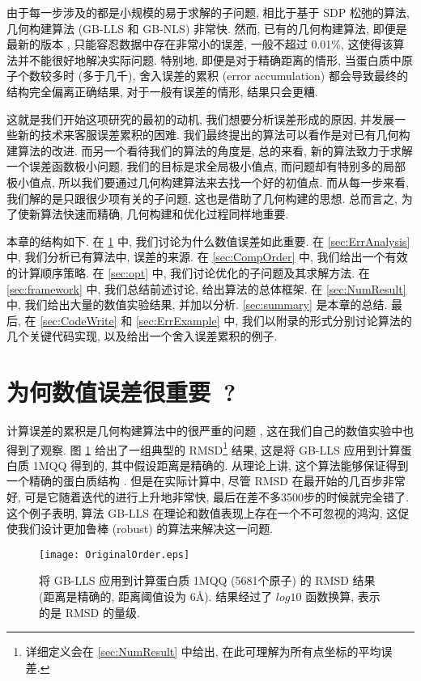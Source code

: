 \documentclass{CASthesis_zzk}
\begin{document}
由于每一步涉及的都是小规模的易于求解的子问题, 相比于基于 SDP 松弛的算法, 
几何构建算法 (GB-LLS 和 GB-NLS) 非常快. 
然而, 已有的几何构建算法, 即便是最新的版本 \cite{Sit2009},
只能容忍数据中存在非常小的误差, 一般不超过 0.01\%, 
这使得该算法并不能很好地解决实际问题.
特别地, 即便是对于精确距离的情形, 当蛋白质中原子个数较多时 (多于几千),
舍入误差的累积 (error accumulation) 都会导致最终的结构完全偏离正确结果,
对于一般有误差的情形, 结果只会更糟.

这就是我们开始这项研究的最初的动机, 我们想要分析误差形成的原因,
并发展一些新的技术来客服误差累积的困难.
我们最终提出的算法可以看作是对已有几何构建算法的改进.
而另一个看待我们的算法的角度是, 
总的来看, 新的算法致力于求解一个误差函数极小问题, 我们的目标是求全局极小值点,
而问题却有特别多的局部极小值点, 所以我们要通过几何构建算法来去找一个好的初值点.
而从每一步来看, 我们解的是只跟很少项有关的子问题,
这也是借助了几何构建的思想.
总而言之, 为了使新算法快速而精确, 几何构建和优化过程同样地重要.

本章的结构如下. 
在 \ref{sec:ErrImportant} 中, 我们讨论为什么数值误差如此重要.
在 \ref{sec:ErrAnalysis} 中, 我们分析已有算法中, 误差的来源.
在 \ref{sec:CompOrder} 中, 我们给出一个有效的计算顺序策略.
在 \ref{sec:opt} 中, 我们讨论优化的子问题及其求解方法.
在 \ref{sec:framework} 中, 我们总结前述讨论, 给出算法的总体框架.
在 \ref{sec:NumResult} 中, 我们给出大量的数值实验结果, 并加以分析.
\ref{sec:summary} 是本章的总结.
最后, 在 \ref{sec:CodeWrite} 和 \ref{sec:ErrExample} 中, 
我们以附录的形式分别讨论算法的几个关键代码实现, 以及给出一个舍入误差累积的例子.

\section{为何数值误差很重要~?}
\label{sec:ErrImportant}

计算误差的累积是几何构建算法中的很严重的问题 \cite{Wu2006,Wu2008}, 
这在我们自己的数值实验中也得到了观察.
图 \ref{fig:OriginalOrder} 给出了一组典型的 RMSD\footnote{详细定义会在 \ref{sec:NumResult} 中给出, 在此可理解为所有点坐标的平均误差.} 结果,
这是将 GB-LLS 应用到计算蛋白质 1MQQ 得到的, 其中假设距离是精确的.
从理论上讲, 这个算法能够保证得到一个精确的蛋白质结构 \cite{Sit2009}. 
但是在实际计算中, 尽管 RMSD 在最开始的几百步非常好, 
可是它随着迭代的进行上升地非常快,
最后在差不多3500步的时候就完全错了.
这个例子表明, 算法 GB-LLS 在理论和数值表现上存在一个不可忽视的鸿沟,
这促使我们设计更加鲁棒 (robust) 的算法来解决这一问题.

\begin{figure}[htbp!]
  \centering
  \texttt{[image: OriginalOrder.eps]}\\
  \caption{将 GB-LLS 应用到计算蛋白质 1MQQ (5681个原子) 的 RMSD 结果 (距离是精确的, 距离阈值设为 6\AA). 结果经过了 $log10$ 函数换算, 表示的是 RMSD 的量级.}
  \label{fig:OriginalOrder}
\end{figure}
\end{document}
